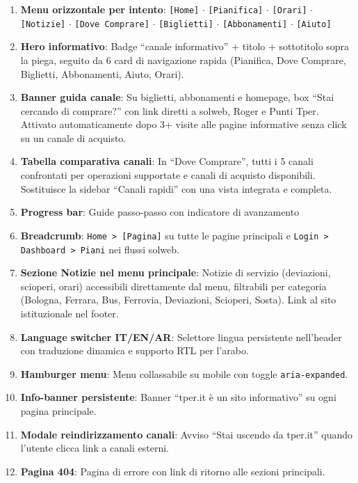﻿\documentclass[11pt,a4paper]{article}
\begin{document}
\begin{tcolorbox}[rffield]
\small
\begin{enumerate}[nosep,leftmargin=*]
  \item \textbf{Menu orizzontale per intento}: \texttt{[Home]} $\cdot$ \texttt{[Pianifica]} $\cdot$ \texttt{[Orari]} $\cdot$ \texttt{[Notizie]} $\cdot$ \texttt{[Dove Comprare]} $\cdot$ \texttt{[Biglietti]} $\cdot$ \texttt{[Abbonamenti]} $\cdot$ \texttt{[Aiuto]}
  \item \textbf{Hero informativo}: Badge ``canale informativo'' + titolo + sottotitolo sopra la piega, seguito da 6 card di navigazione rapida (Pianifica, Dove Comprare, Biglietti, Abbonamenti, Aiuto, Orari).
  \item \textbf{Banner guida canale}: Su biglietti, abbonamenti e homepage, box ``Stai cercando di comprare?'' con link diretti a solweb, Roger e Punti Tper. Attivato automaticamente dopo 3+ visite alle pagine informative senza click su un canale di acquisto.
  \item \textbf{Tabella comparativa canali}: In ``Dove Comprare'', tutti i 5 canali confrontati per operazioni supportate e canali di acquisto disponibili. Sostituisce la sidebar ``Canali rapidi'' con una vista integrata e completa.
  \item \textbf{Progress bar}: Guide passo-passo con indicatore di avanzamento
  \item \textbf{Breadcrumb}: \texttt{Home > [Pagina]} su tutte le pagine principali e \texttt{Login > Dashboard > Piani} nei flussi solweb.
  \item \textbf{Sezione Notizie nel menu principale}: Notizie di servizio (deviazioni, scioperi, orari) accessibili direttamente dal menu, filtrabili per categoria (Bologna, Ferrara, Bus, Ferrovia, Deviazioni, Scioperi, Sosta). Link al sito istituzionale nel footer.
  \item \textbf{Language switcher IT/EN/AR}: Selettore lingua persistente nell'header con traduzione dinamica e supporto RTL per l'arabo.
  \item \textbf{Hamburger menu}: Menu collassabile su mobile con toggle \texttt{aria-expanded}.
  \item \textbf{Info-banner persistente}: Banner ``tper.it \`e un sito informativo'' su ogni pagina principale.
  \item \textbf{Modale reindirizzamento canali}: Avviso ``Stai uscendo da tper.it'' quando l'utente clicca link a canali esterni.
  \item \textbf{Pagina 404}: Pagina di errore con link di ritorno alle sezioni principali.
\end{enumerate}
\end{tcolorbox}
\end{document}
